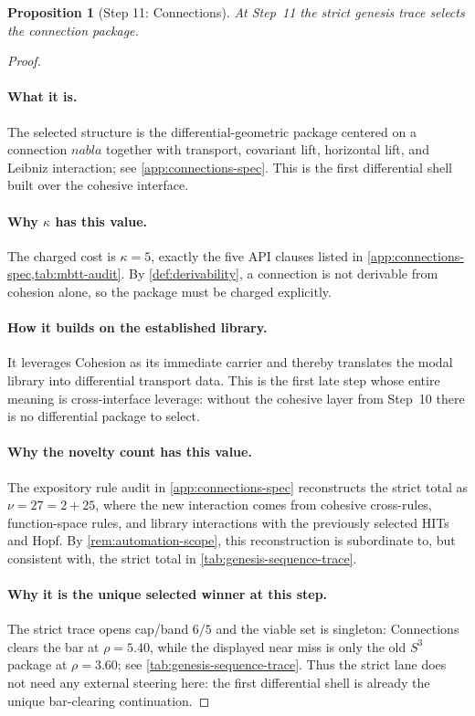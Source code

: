 \documentclass[11pt,a4paper]{article}
\def\nabla{nabla}%
\theoremstyle{plain}
\newtheorem{proposition}[theorem]{Proposition}
\theoremstyle{definition}
\theoremstyle{remark}
\begin{document}
\begin{proposition}[Step 11: Connections]
\label{prop:genesis-step11}
At Step~11 the strict genesis trace selects the connection package.
\end{proposition}

\begin{proof}
\paragraph{What it is.}
The selected structure is the differential-geometric package centered on a
connection $\nabla$ together with transport, covariant lift, horizontal lift,
and Leibniz interaction; see \cref{app:connections-spec}.
This is the first differential shell built over the cohesive interface.

\paragraph{Why $\kappa$ has this value.}
The charged cost is $\kappa=5$, exactly the five API clauses listed in
\cref{app:connections-spec,tab:mbtt-audit}.
By \cref{def:derivability}, a connection is not derivable from cohesion alone,
so the package must be charged explicitly.

\paragraph{How it builds on the established library.}
It leverages Cohesion as its immediate carrier and thereby translates the modal
library into differential transport data.
This is the first late step whose entire meaning is cross-interface leverage:
without the cohesive layer from Step~10 there is no differential package to
select.

\paragraph{Why the novelty count has this value.}
The expository rule audit in \cref{app:connections-spec} reconstructs the strict
total as $\nu=27=2+25$, where the new interaction comes from cohesive
cross-rules, function-space rules, and library interactions with the previously
selected HITs and Hopf.
By \cref{rem:automation-scope}, this reconstruction is subordinate to, but
consistent with, the strict total in \cref{tab:genesis-sequence-trace}.

\paragraph{Why it is the unique selected winner at this step.}
The strict trace opens cap/band $6/5$ and the viable set is singleton:
Connections clears the bar at $\rho=5.40$, while the displayed near miss is only
the old $S^3$ package at $\rho=3.60$; see
\cref{tab:genesis-sequence-trace}.
Thus the strict lane does not need any external steering here: the first
differential shell is already the unique bar-clearing continuation.
\end{proof}
\end{document}
